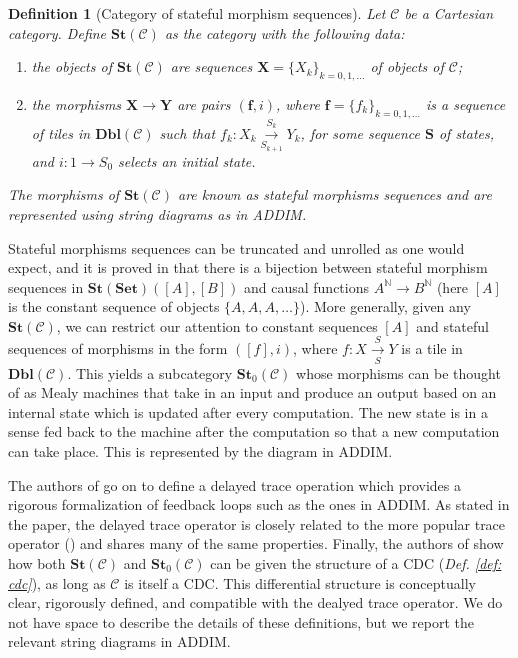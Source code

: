\documentclass[11pt,a4paper,openright,twoside]{report}
\theoremstyle{plain}
\newtheorem{definition}[proposition]{Definition}
\theoremstyle{definition}
\begin{document}
\begin{definition}[Category of stateful morphism sequences]
  Let $\mathcal{C}$ be a Cartesian category. Define $\mathbf{St}(\mathcal{C})$ as the category with the following data:
  \begin{enumerate}
    \item the objects of $\mathbf{St}(\mathcal{C})$ are sequences $\mathbf{X} = \{X_k\}_{k = 0,1,\dots}$ of objects of $\mathcal{C}$;
    \item the morphisms $\mathbf{X} \to \mathbf{Y}$ are pairs $(\mathbf{f}, i)$, where $\mathbf{f} = \{f_k\}_{k = 0,1,\dots}$ is a sequence of tiles in $\mathbf{Dbl}(\mathcal{C})$ such that $f_k: X_k \overset{S_k}{\underset{S_{k+1}}\longrightarrow} Y_k$, for some sequence $\mathbf{S}$ of states, and $i: 1 \to S_0$ selects an initial state. 
  \end{enumerate}
  The morphisms of $\mathbf{St}(\mathcal{C})$ are known as stateful morphisms sequences and are represented using string diagrams as in ADDIM.
\end{definition}

Stateful morphisms sequences can be truncated and unrolled as one would expect, and it is proved in \cite{sprunger2019differentiable} that there is a bijection between stateful morphism sequences in $\mathbf{St}(\mathbf{Set})([A],[B])$ and causal functions $A^{\mathbb{N}} \to B^{\mathbb{N}}$ (here $[A]$ is the constant sequence of objects $\{A,A,A,\dots\}$). More generally, given any $\mathbf{St}(\mathcal{C})$, we can restrict our attention to constant sequences $[A]$ and stateful sequences of morphisms in the form $([f],i)$, where $f:X \overset{S}{\underset{S}\longrightarrow} Y$ is a tile in $\mathbf{Dbl}(\mathcal{C})$. This yields a subcategory $\mathbf{St}_0(\mathcal{C})$ whose morphisms can be thought of as Mealy machines that take in an input and produce an output based on an internal state which is updated after every computation. The new state is in a sense fed back to the machine after the computation so that a new computation can take place. This is represented by the diagram in ADDIM.

The authors of \cite{sprunger2019differentiable} go on to define a delayed trace operation which provides a rigorous formalization of feedback loops such as the ones in ADDIM. As stated in the paper, the delayed trace operator is closely related to the more popular trace operator (\cite{joyal1996traced}) and shares many of the same properties. 
Finally, the authors of \cite{sprunger2019differentiable} show how both $\mathbf{St}(\mathcal{C})$ and $\mathbf{St}_0(\mathcal{C})$ can be given the structure of a CDC (\textit{Def. \ref{def: cdc}}), as long as $\mathcal{C}$ is itself a CDC. This differential structure is conceptually clear, rigorously defined, and compatible with the dealyed trace operator. We do not have space to describe the details of these definitions, but we report the relevant string diagrams in ADDIM.
\end{document}
